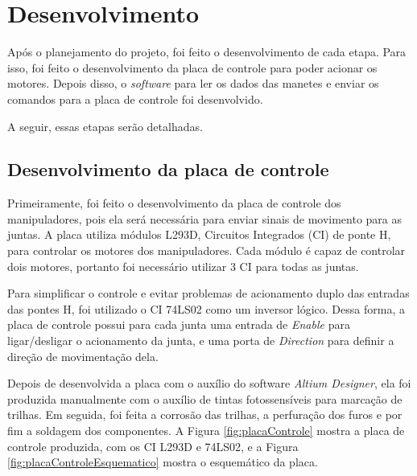 \section[Desenvolvimento]{Desenvolvimento}
\label{cap:desenvolvimento}

Após o planejamento do projeto, foi feito o desenvolvimento de cada etapa.
Para isso, foi feito o desenvolvimento da placa de controle para poder acionar os motores.
Depois disso, o \textit{software} para ler os dados das manetes e enviar os comandos para a placa de controle foi desenvolvido.

A seguir, essas etapas serão detalhadas.

\subsection[Desenvolvimento da placa de controle]{Desenvolvimento da placa de controle}

Primeiramente, foi feito o desenvolvimento da placa de controle dos manipuladores, pois ela será necessária para enviar sinais de movimento para as juntas.
A placa utiliza módulos L293D, Circuitos Integrados (CI) de ponte H, para controlar os motores dos manipuladores.
Cada módulo é capaz de controlar dois motores, portanto foi necessário utilizar 3 CI para todas as juntas.

Para simplificar o controle e evitar problemas de acionamento duplo das entradas das pontes H, foi utilizado o CI 74LS02 como um inversor lógico.
Dessa forma, a placa de controle possui para cada junta uma entrada de \textit{Enable} para ligar/desligar o acionamento da junta, e uma porta de \textit{Direction} para definir a direção de movimentação dela.

Depois de desenvolvida a placa com o auxílio do software \textit{Altium Designer}, ela foi produzida manualmente com o auxílio de tintas fotossensíveis para marcação de trilhas.
Em seguida, foi feita a corrosão das trilhas, a perfuração dos furos e por fim a soldagem dos componentes.
A Figura \ref{fig:placaControle} mostra a placa de controle produzida, com os CI L293D e 74LS02, e a Figura \ref{fig:placaControleEsquematico} mostra o esquemático da placa.

